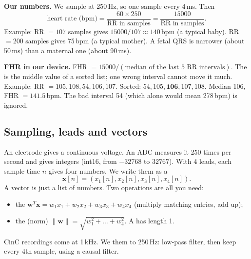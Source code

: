 \documentclass[11pt]{article}
\begin{document}
\begin{center}
\end{center}

\textbf{Our numbers.} We sample at 250\,Hz, so one sample every 4\,ms. Then
\[
\text{heart rate (bpm)} = \frac{60 \times 250}{\text{RR in samples}} = \frac{15000}{\text{RR in samples}}.
\]
Example: RR $= 107$ samples gives $15000/107 \approx 140$\,bpm (a typical baby). RR $= 200$ samples gives 75\,bpm (a typical mother). A fetal QRS is narrower (about 50\,ms) than a maternal one (about 90\,ms).

\textbf{FHR in our device.} FHR $= 15000 / (\text{median of the last 5 RR intervals})$. The  is the middle value of a sorted list; one wrong interval cannot move it much. Example: RR $= 105, 108, 54, 106, 107$. Sorted: $54, 105, \mathbf{106}, 107, 108$. Median 106, FHR $= 141.5$\,bpm. The bad interval 54 (which alone would mean 278\,bpm) is ignored.

\subsection{Sampling, leads and vectors}
An electrode gives a continuous voltage. An ADC measures it 250 times per second and gives integers (int16, from $-32768$ to $32767$). With 4 leads, each sample time $n$ gives four numbers. We write them as a 
\[
\mathbf{x}[n] = (x_1[n], x_2[n], x_3[n], x_4[n]).
\]
A vector is just a list of numbers. Two operations are all you need:
\begin{itemize}
  \item the  $\mathbf{w}^T\mathbf{x} = w_1x_1 + w_2x_2 + w_3x_3 + w_4x_4$ (multiply matching entries, add up);
  \item the  (norm) $\|\mathbf{w}\| = \sqrt{w_1^2 + \dots + w_4^2}$. A  has length 1.
\end{itemize}
CinC recordings come at 1\,kHz. We  them to 250\,Hz: low-pass filter, then keep every 4th sample, using a causal filter.
\end{document}
